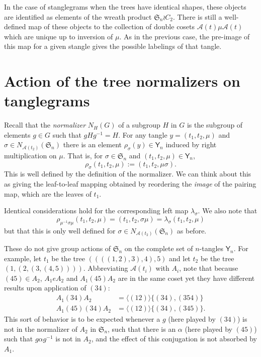 \documentclass{amsart}
\newcommand{\fS}{\mathfrak S}
\newcommand{\aut}{\mathcal A}
\newcommand{\pairing}{\mu}
\newcommand{\tangle}{\mathsf{Y}}
\newcommand{\wrtwo}{\wr C_2}
\begin{document}
In the case of stanglegrams when the trees have identical shapes, these objects are identified as elements of the wreath product $\fS_n \wrtwo$.
There is still a well-defined map of these objects to the collection of double cosets $\aut(t) \pairing \aut(t)$ which are unique up to inversion of $\pairing$.
As in the previous case, the pre-image of this map for a given stangle gives the possible labelings of that tangle.


\section{Action of the tree normalizers on tanglegrams}
Recall that the \emph{normalizer} $N_H(G)$ of a subgroup $H$ in $G$ is the subgroup of elements $g \in G$ such that $gHg^{-1} = H$.
For any tangle $y = (t_1, t_2, \pairing)$ and $\sigma \in N_{\aut(t_2)}(\fS_n)$ there is an element $\rho_\sigma(y) \in \tangle_n$ induced by right multiplication on $\pairing$.
That is, for $\sigma \in \fS_n$ and $(t_1, t_2, \pairing) \in \tangle_n$,
\begin{equation}
\label{eq:action}
\rho_\sigma (t_1, t_2, \pairing) := (t_1, t_2, \pairing \sigma).
\end{equation}
This is well defined by the definition of the normalizer.
We can think about this as giving the leaf-to-leaf mapping obtained by reordering the \emph{image} of the pairing map, which are the leaves of $t_1$.

Identical considerations hold for the corresponding left map $\lambda_\sigma$.
We also note that
\[
\rho_{\pairing^{-1} \sigma \pairing} (t_1, t_2, \pairing) =
(t_1, t_2, \sigma \pairing) =
\lambda_{\sigma} (t_1, t_2, \pairing)
\]
but that this is only well defined for $\sigma \in N_{\aut(t_2)}(\fS_n)$ as before.

These do not give group actions of $\fS_n$ on the complete set of $n$-tangles $\tangle_n$.
For example, let $t_1$ be the tree $((((1,2),3),4),5)$ and let $t_2$ be the tree $(1,(2,(3,(4,5))))$.
Abbreviating $\aut(t_i)$ with $A_i$, note that because $(4 5) \in A_2$, $A_1 e A_2$ and $A_1 (4 5) A_2$ are in the same coset yet they have different results upon application of $(3 4)$:
\begin{align*}
A_1 (3 4) A_2 & = \langle (1 2) \rangle \{(3 4), (3 5 4)\} \\
A_1 (4 5) (3 4) A_2 & = \langle (1 2) \rangle \{(3 4), (3 4 5)\}.
\end{align*}
This sort of behavior is to be expected whenever a $g$ (here played by $(3 4)$) is not in the normalizer of $A_2$ in $\fS_n$, such that there is an $\alpha$ (here played by $(4 5)$) such that $g \alpha g^{-1}$ is not in $A_2$, and the effect of this conjugation is not absorbed by $A_1$.
\end{document}
